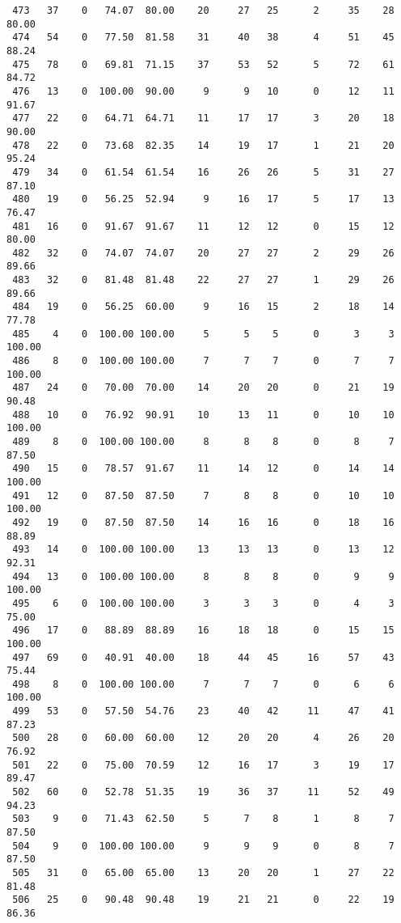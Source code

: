 \begin{verbatim}
 473   37    0   74.07  80.00    20     27   25      2     35    28    80.00
 474   54    0   77.50  81.58    31     40   38      4     51    45    88.24
 475   78    0   69.81  71.15    37     53   52      5     72    61    84.72
 476   13    0  100.00  90.00     9      9   10      0     12    11    91.67
 477   22    0   64.71  64.71    11     17   17      3     20    18    90.00
 478   22    0   73.68  82.35    14     19   17      1     21    20    95.24
 479   34    0   61.54  61.54    16     26   26      5     31    27    87.10
 480   19    0   56.25  52.94     9     16   17      5     17    13    76.47
 481   16    0   91.67  91.67    11     12   12      0     15    12    80.00
 482   32    0   74.07  74.07    20     27   27      2     29    26    89.66
 483   32    0   81.48  81.48    22     27   27      1     29    26    89.66
 484   19    0   56.25  60.00     9     16   15      2     18    14    77.78
 485    4    0  100.00 100.00     5      5    5      0      3     3   100.00
 486    8    0  100.00 100.00     7      7    7      0      7     7   100.00
 487   24    0   70.00  70.00    14     20   20      0     21    19    90.48
 488   10    0   76.92  90.91    10     13   11      0     10    10   100.00
 489    8    0  100.00 100.00     8      8    8      0      8     7    87.50
 490   15    0   78.57  91.67    11     14   12      0     14    14   100.00
 491   12    0   87.50  87.50     7      8    8      0     10    10   100.00
 492   19    0   87.50  87.50    14     16   16      0     18    16    88.89
 493   14    0  100.00 100.00    13     13   13      0     13    12    92.31
 494   13    0  100.00 100.00     8      8    8      0      9     9   100.00
 495    6    0  100.00 100.00     3      3    3      0      4     3    75.00
 496   17    0   88.89  88.89    16     18   18      0     15    15   100.00
 497   69    0   40.91  40.00    18     44   45     16     57    43    75.44
 498    8    0  100.00 100.00     7      7    7      0      6     6   100.00
 499   53    0   57.50  54.76    23     40   42     11     47    41    87.23
 500   28    0   60.00  60.00    12     20   20      4     26    20    76.92
 501   22    0   75.00  70.59    12     16   17      3     19    17    89.47
 502   60    0   52.78  51.35    19     36   37     11     52    49    94.23
 503    9    0   71.43  62.50     5      7    8      1      8     7    87.50
 504    9    0  100.00 100.00     9      9    9      0      8     7    87.50
 505   31    0   65.00  65.00    13     20   20      1     27    22    81.48
 506   25    0   90.48  90.48    19     21   21      0     22    19    86.36

\end{verbatim}
